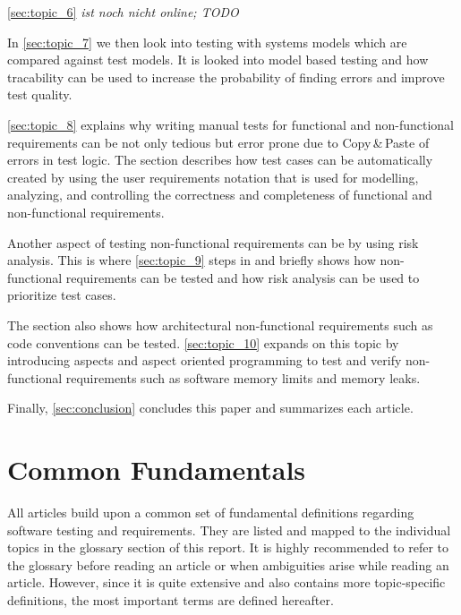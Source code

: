 \autoref{sec:topic_6} %
\textit{ist noch nicht online; TODO}

In \autoref{sec:topic_7} %
we then look into testing with systems models which are compared against test models.
It is looked into model based testing and how tracability can be used to increase the probability of finding errors and improve test quality.

\autoref{sec:topic_8} %
explains why writing manual tests for functional and non-functional requirements can be  not only tedious but error prone due to Copy\,\&\,Paste of errors in test logic.
The section describes how test cases can be automatically created by using the user requirements notation that is used for modelling, analyzing, and controlling the correctness and completeness of functional and non-functional requirements.

Another aspect of testing non-functional requirements can be by using risk analysis.
This is where \autoref{sec:topic_9}%
steps in and briefly shows how non-functional requirements can be tested and how risk analysis can be used to prioritize test cases.

The section also shows how architectural non-functional requirements such as code conventions can be tested.
\autoref{sec:topic_10} %
expands on this topic by introducing aspects and aspect oriented programming to test and verify non-functional requirements such as software memory limits and memory leaks.

Finally, \autoref{sec:conclusion} concludes this paper and summarizes each article.

\section{Common Fundamentals}\label{sec:introduction_common_fundamentals}
All articles build upon a common set of fundamental definitions regarding software testing and requirements.
They are listed and mapped to the individual topics in the glossary section of this report.
It is highly recommended to refer to the glossary before reading an article or when ambiguities arise while reading an article.
However, since it is quite extensive and also contains more topic-specific definitions, the most important terms are defined hereafter.

